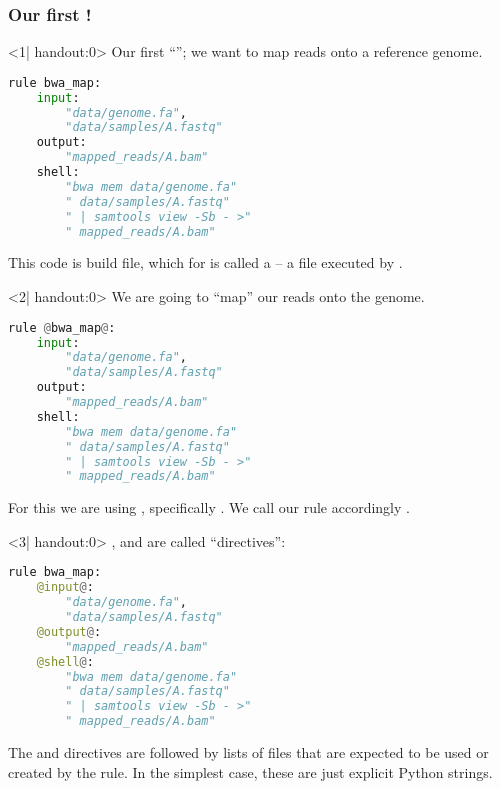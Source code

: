 \begin{frame}[fragile]
  \frametitle{Our first !}
  \begin{onlyenv}<1| handout:0>
    Our first ``''; we want to map reads onto a reference genome. 
    \begin{lstlisting}[language=Python,style=Python]
rule bwa_map:
    input:
        "data/genome.fa",
        "data/samples/A.fastq"
    output:
        "mapped_reads/A.bam"
    shell:
        "bwa mem data/genome.fa"
        " data/samples/A.fastq"
        " | samtools view -Sb - >"
        " mapped_reads/A.bam"
    \end{lstlisting}
    \begin{docs}
    	This code is build file, which for \Snakemake{} is called a  -- a file executed by \Snakemake{}.
    \end{docs}
    \end{onlyenv}
  \begin{onlyenv}<2| handout:0>
   We are going to ``map'' our reads onto the genome.
   \begin{lstlisting}[language=Python,style=Python]
rule @bwa_map@:
    input:
        "data/genome.fa",
        "data/samples/A.fastq"
    output:
        "mapped_reads/A.bam"
    shell:
        "bwa mem data/genome.fa"
        " data/samples/A.fastq"
        " | samtools view -Sb - >"
        " mapped_reads/A.bam"
    \end{lstlisting}
    For this we are using , specifically . We call our rule accordingly .
  \end{onlyenv}
  \begin{onlyenv}<3| handout:0>
   ,  and  are called ``directives'':
   \begin{lstlisting}[language=Python,style=Python]
rule bwa_map:
    @input@:
        "data/genome.fa",
        "data/samples/A.fastq"
    @output@:
        "mapped_reads/A.bam"
    @shell@:
        "bwa mem data/genome.fa"
        " data/samples/A.fastq"
        " | samtools view -Sb - >"
        " mapped_reads/A.bam"
    \end{lstlisting}
    The  and  directives are followed by lists of files that are expected to be used or created by the rule. In the simplest case, these are just explicit Python strings.
  \end{onlyenv}

\end{frame}
